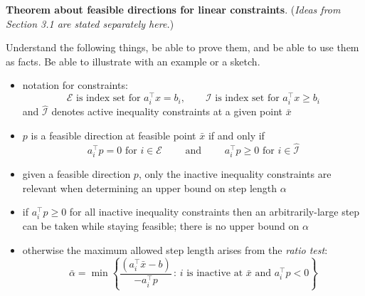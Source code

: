 \documentclass[12pt]{amsart}
\begin{document}

\bigskip
\noindent \textbf{Theorem about feasible directions for linear constraints}.  (\emph{Ideas from Section 3.1 are stated separately here.})

\medskip
\noindent Understand the following things, be able to prove them, and be able to use them as facts.  Be able to illustrate with an example or a sketch.
\begin{itemize}
\item notation for constraints:
   $$\mathcal{E} \text{ is index set for } a_i^\top x = b_i, \qquad \mathcal{I} \text{ is index set for } a_i^\top x \ge b_i$$
and $\hat{\mathcal{I}}$ denotes active inequality constraints at a given point $\bar x$
\item $p$ is a feasible direction at feasible point $\bar x$ if and only if 
        $$a_i^\top p = 0 \text{ for } i\in \mathcal{E} \qquad \text{ and } \qquad  a_i^\top p \ge 0 \text{ for }i \in \hat{\mathcal{I}}$$
\item given a feasible direction $p$, only the inactive inequality constraints are relevant when determining an upper bound on step length $\alpha$ 
\item if $a_i^\top p \ge 0$ for all inactive inequality constraints then an arbitrarily-large step can be taken while staying feasible; there is no upper bound on $\alpha$ 
\item otherwise the maximum allowed step length arises from the \emph{ratio test}: 
        $$\bar \alpha = \min \left\{\frac{(a_i^\top \bar x - b)}{-a_i^\top p} \,:\, i \text{ is inactive at $\bar x$ and } a_i^\top p < 0\right\}$$
\end{itemize}

\end{document}
